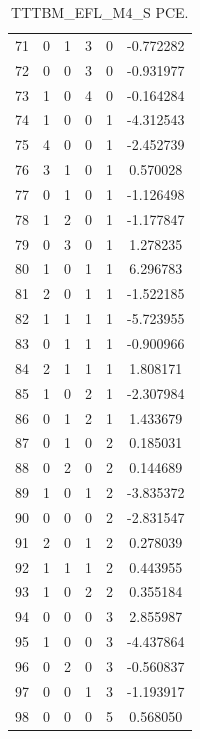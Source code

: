 \documentclass[preprint,12pt]{elsarticle}
\begin{document}
\begin{table}
\begin{minipage}[h!]{0.23\textwidth}
{\begin{tabular}{|c|ccccc|}
71 &   0 &   1 &   3 &   0 &   -0.772282 \\
72 &   0 &   0 &   3 &   0 &   -0.931977 \\
73 &   1 &   0 &   4 &   0 &   -0.164284 \\
74 &   1 &   0 &   0 &   1 &   -4.312543 \\
75 &   4 &   0 &   0 &   1 &   -2.452739 \\
76 &   3 &   1 &   0 &   1 &    0.570028 \\
77 &   0 &   1 &   0 &   1 &   -1.126498 \\
78 &   1 &   2 &   0 &   1 &   -1.177847 \\
79 &   0 &   3 &   0 &   1 &    1.278235 \\
80 &   1 &   0 &   1 &   1 &    6.296783 \\
81 &   2 &   0 &   1 &   1 &   -1.522185 \\
82 &   1 &   1 &   1 &   1 &   -5.723955 \\
83 &   0 &   1 &   1 &   1 &   -0.900966 \\
84 &   2 &   1 &   1 &   1 &    1.808171 \\
85 &   1 &   0 &   2 &   1 &   -2.307984 \\
86 &   0 &   1 &   2 &   1 &    1.433679 \\
87 &   0 &   1 &   0 &   2 &    0.185031 \\
88 &   0 &   2 &   0 &   2 &    0.144689 \\
89 &   1 &   0 &   1 &   2 &   -3.835372 \\
90 &   0 &   0 &   0 &   2 &   -2.831547 \\
91 &   2 &   0 &   1 &   2 &    0.278039 \\
92 &   1 &   1 &   1 &   2 &    0.443955 \\
93 &   1 &   0 &   2 &   2 &    0.355184 \\
94 &   0 &   0 &   0 &   3 &    2.855987 \\
95 &   1 &   0 &   0 &   3 &   -4.437864 \\
96 &   0 &   2 &   0 &   3 &   -0.560837 \\
97 &   0 &   0 &   1 &   3 &   -1.193917 \\
98 &   0 &   0 &   0 &   5 &    0.568050 \\
\hline
\end{tabular}}
\caption{\tiny TTTBM\_EFL\_M4\_S PCE.}
\end{minipage}%
\end{table}
%
%
\end{document}
